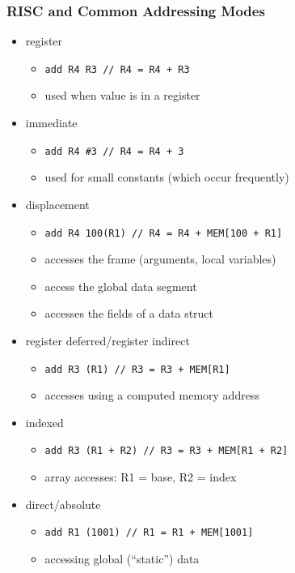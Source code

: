 \documentclass[12pt]{extarticle}
\begin{document}
	\subsubsection{RISC and Common Addressing Modes}

	\begin{itemize}
		\item register
		\begin{itemize}
			\item \texttt{add R4 R3 // R4 = R4 + R3}
			\item used when value is in a register
		\end{itemize}

		\item immediate
		\begin{itemize}
			\item \texttt{add R4 \#3 // R4 = R4 + 3}
			\item used for small constants (which occur frequently)
		\end{itemize}

		\item displacement
		\begin{itemize}
			\item \texttt{add R4 100(R1) // R4 = R4 + MEM[100 + R1]}
			\item accesses the frame (arguments, local variables)
			\item access the global data segment
			\item accesses the fields of a data struct
		\end{itemize}

		\item register deferred/register indirect
		\begin{itemize}
			\item \texttt{add R3 (R1) // R3 = R3 + MEM[R1]}
			\item accesses using a computed memory address
		\end{itemize}

		\item indexed
		\begin{itemize}
			\item \texttt{add R3 (R1 + R2) // R3 = R3 + MEM[R1 + R2]}
			\item array accesses: R1 = base, R2 = index
		\end{itemize}

		\item direct/absolute
		\begin{itemize}
			\item \texttt{add R1 (1001) // R1 = R1 + MEM[1001]}
			\item accessing global (``static'') data
		\end{itemize}


\end{itemize}
\end{document}
